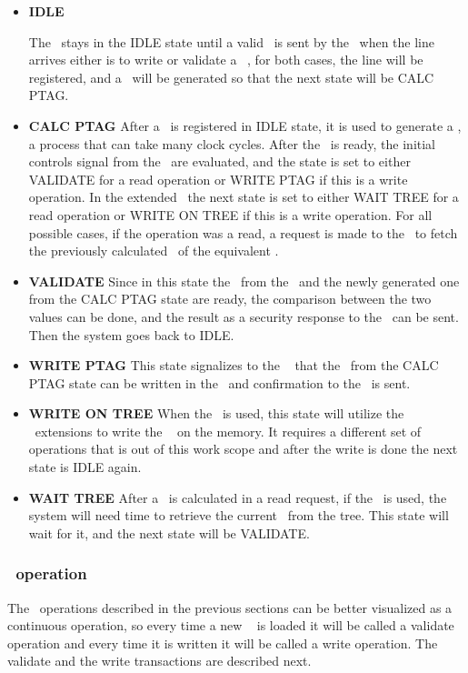 \begin{itemize}
  \item{\textbf{IDLE}}
 
The \seceng~stays in the IDLE  state until a valid \sline~is sent by the \handler~when the line arrives either is to write or validate a \ptag~, for both cases, the line will be registered, and a \ptag~will be generated so that the next state will be CALC PTAG. 
 
  \item{\textbf{CALC PTAG}}
  After a \sline~is registered in IDLE state, it is used to generate a \ptag, a process that can take many clock cycles. After the \ptag~is ready, the initial controls signal from the \handler~are evaluated, and the state is set to either VALIDATE for a read operation or  WRITE PTAG if this is a write operation.  In the extended \cshia~the next state is set to either WAIT TREE for a read operation or  WRITE ON TREE if this is a write operation. For all possible cases, if the operation was a read, a request is made to the \pmmu~to fetch the previously calculated \ptag~of the equivalent \sline.
  

  \item{\textbf{VALIDATE}}
  Since in this state the \ptag~from the \ptagmem~and the newly generated one from the CALC PTAG state are ready, the comparison between the two values can be done, and the result as a security response to the \handler~can be sent. Then the system goes back to IDLE.
  

 \item{\textbf{WRITE PTAG}}
  This state signalizes to the \pmmu~ that the \ptag~from the CALC PTAG state can be written in the \ptagmem~and confirmation to the \handler~is sent.
  
   \item{\textbf{WRITE ON TREE}}
  When the \mt~is used, this state will utilize the \cshia~extensions to write the \ptag~ on the memory. It requires a different set of operations that is out of this work scope and after the write is done the next state is IDLE again.
  
  \item{\textbf{WAIT TREE}}
  After a \ptag~is calculated in a read request, if the \mt~is used,  the system will need time to retrieve the current \ptag~from the tree. This state will wait for it, and the next state will be VALIDATE.

\end{itemize}

\subsubsection{\seceng~operation }
The \seceng~operations described in the previous sections can be better visualized as a continuous operation, so every time a new \sline~ is loaded it will be called a validate operation and every time it is written it will be called a write operation. The validate and the write transactions are described next.


